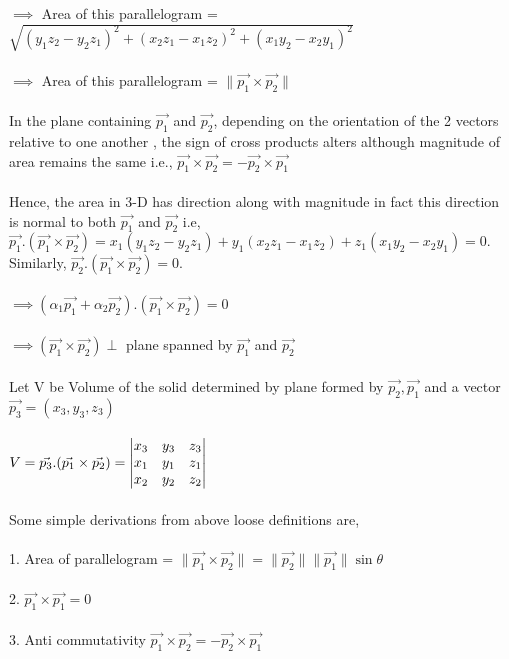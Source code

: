 \documentclass{article}
\begin{document}
    $\implies$ Area of this parallelogram = $\sqrt{ (y_1z_2 - y_2z_1)^2 + (x_2z_1 - x_1z_2)^2 + (x_1y_2 - x_2y_1)^2}$ \\ \\
    $\implies$ Area of this parallelogram = $\lVert \Vec{p_1} \times \Vec{p_2} \rVert$ \\ \\
    In the plane containing $\Vec{p_1}$ and $\Vec{p_2}$, depending on the orientation of the 2 vectors relative to one another , the sign of cross products alters although magnitude of area remains the same i.e., $\Vec{p_1} \times \Vec{p_2} = - \Vec{p_2} \times \Vec{p_1} $ \\ \\
    Hence, the area in 3-D has direction along with magnitude in fact this direction is normal to both $\Vec{p_1}$ and $\Vec{p_2}$ i.e, $\Vec{p_{1}} . (\Vec{p_1} \times \Vec{p_2}) = x_1(y_1z_2 - y_2z_1) + y_1(x_2z_1 - x_1z_2) + z_1(x_1y_2 - x_2y_1) = 0.$ Similarly, $\Vec{p_{2}} . (\Vec{p_1} \times \Vec{p_2}) = 0$. \\ \\
    $\implies (\alpha_1 \Vec{p_{1}} + \alpha_2 \Vec{p_{2}}) . (\Vec{p_1} \times \Vec{p_2}) = 0$ \\ \\
    $\implies (\Vec{p_1} \times \Vec{p_2}) \perp $ plane spanned by $\Vec{p_1}$ and $\Vec{p_2}$ \\ \\
   Let V be Volume of the solid determined by plane formed by $ \Vec{p_2}, \Vec{p_1} $ and a vector $\Vec{p_3} = (x_3,y_3,z_3)$ \\ \\
   $V = \Vec{p_3} . (\Vec{p_1} \times \Vec{p_2}) = \mdet{x_3 & y_3 & z_3\\ x_1 & y_1 & z_1 \\ x_2 & y_2 & z_2}$ \\ \\
   Some simple derivations from above loose definitions are, \\ \\
    1. Area of parallelogram = $\lVert \Vec{p_1} \times \Vec{p_2} \rVert = \lVert \Vec{p_2} \rVert \lVert \Vec{p_1} \rVert \sin{\theta}$ \\ \\
    2. $\Vec{p_1} \times \Vec{p_1} = 0$ \\ \\
    3. Anti commutativity $\Vec{p_1} \times \Vec{p_2} = - \Vec{p_2} \times \Vec{p_1}$
\end{document}

